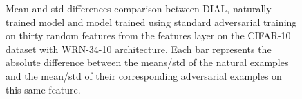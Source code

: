 
\begin{figure}[ht]
\centering
  \caption{Mean and std differences comparison between DIAL, naturally trained model and model trained using standard adversarial training on thirty random features from the features layer on the CIFAR-10 dataset with WRN-34-10 architecture. Each bar represents the absolute difference between the means/std of the natural examples and the mean/std of their corresponding adversarial examples on this same feature.}
  \label{feat_layer_stat2}
\end{figure}


  
